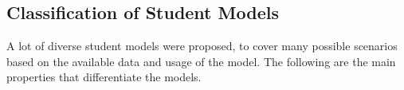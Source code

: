 

\subsection{Classification of Student Models}

A lot of diverse student models were proposed, to cover many possible scenarios
based on the available data and usage of the model. The following
are the main properties that differentiate the models.

